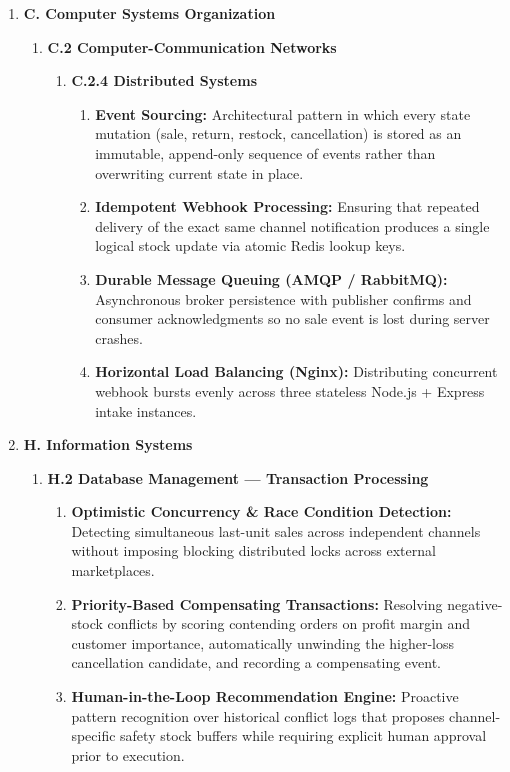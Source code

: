 \documentclass[oneside,a4paper,12pt]{report}
\begin{document}
\begin{enumerate}
  \item \textbf{C. Computer Systems Organization}
  \begin{enumerate}
    \item \textbf{C.2 Computer-Communication Networks}
    \begin{enumerate}
      \item \textbf{C.2.4 Distributed Systems}
      \begin{enumerate}
        \item \textbf{Event Sourcing:} Architectural pattern in which every state mutation (sale, return, restock, cancellation) is stored as an immutable, append-only sequence of events rather than overwriting current state in place.
        \item \textbf{Idempotent Webhook Processing:} Ensuring that repeated delivery of the exact same channel notification produces a single logical stock update via atomic Redis lookup keys.
        \item \textbf{Durable Message Queuing (AMQP / RabbitMQ):} Asynchronous broker persistence with publisher confirms and consumer acknowledgments so no sale event is lost during server crashes.
        \item \textbf{Horizontal Load Balancing (Nginx):} Distributing concurrent webhook bursts evenly across three stateless Node.js + Express intake instances.
      \end{enumerate}
    \end{enumerate}
  \end{enumerate}
  \item \textbf{H. Information Systems}
  \begin{enumerate}
    \item \textbf{H.2 Database Management — Transaction Processing}
    \begin{enumerate}
      \item \textbf{Optimistic Concurrency \& Race Condition Detection:} Detecting simultaneous last-unit sales across independent channels without imposing blocking distributed locks across external marketplaces.
      \item \textbf{Priority-Based Compensating Transactions:} Resolving negative-stock conflicts by scoring contending orders on profit margin and customer importance, automatically unwinding the higher-loss cancellation candidate, and recording a compensating event.
      \item \textbf{Human-in-the-Loop Recommendation Engine:} Proactive pattern recognition over historical conflict logs that proposes channel-specific safety stock buffers while requiring explicit human approval prior to execution.
    \end{enumerate}
  \end{enumerate}
\end{enumerate}
\end{document}
